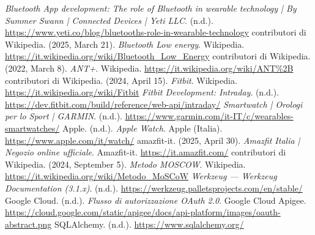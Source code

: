 \documentclass[12pt,a4paper,oneside]{report}
\begin{document}
\begin{thebibliography}{99}
     \textit{Bluetooth App development: The role of Bluetooth in wearable technology | By Summer Swann | Connected Devices | Yeti LLC}. (n.d.). \url{https://www.yeti.co/blog/bluetooths-role-in-wearable-technology}
     contributori di Wikipedia. (2025, March 21). \textit{Bluetooth Low energy}. Wikipedia. \url{https://it.wikipedia.org/wiki/Bluetooth_Low_Energy}
     contributori di Wikipedia. (2022, March 8). \textit{ANT+}. Wikipedia. \url{https://it.wikipedia.org/wiki/ANT%2B}
     contributori di Wikipedia. (2024, April 15). \textit{Fitbit}. Wikipedia. \url{https://it.wikipedia.org/wiki/Fitbit}
     \textit{Fitbit Development: Intraday}. (n.d.). \url{https://dev.fitbit.com/build/reference/web-api/intraday/}
     \textit{Smartwatch | Orologi per lo Sport | GARMIN}. (n.d.). \url{https://www.garmin.com/it-IT/c/wearables-smartwatches/}
     Apple. (n.d.). \textit{Apple Watch}. Apple (Italia). \url{https://www.apple.com/it/watch/}
     amazfit-it. (2025, April 30). \textit{Amazfit Italia | Negozio online ufficiale}. Amazfit-it. \url{https://it.amazfit.com/}
     contributori di Wikipedia. (2024, September 5). \textit{Metodo MOSCOW}. Wikipedia. \url{https://it.wikipedia.org/wiki/Metodo_MoSCoW}
     \textit{Werkzeug — Werkzeug Documentation (3.1.x)}. (n.d.). \url{https://werkzeug.palletsprojects.com/en/stable/}
     Google Cloud. (n.d.). \textit{Flusso di autorizzazione OAuth 2.0}. Google Cloud Apigee. \url{https://cloud.google.com/static/apigee/docs/api-platform/images/oauth-abstract.png}
     SQLAlchemy. (n.d.). \url{https://www.sqlalchemy.org/}
\end{thebibliography}
\end{document}
